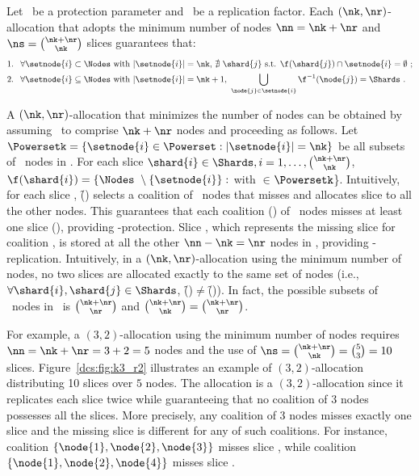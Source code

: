 \smallskip
\begin{theorem}\label{dcs:theo:p4}
Let \nk\ be a protection parameter and \nr\ be a replication
factor. Each $(\nk,\nr)$-allocation that adopts the minimum number of
nodes $\nn = \nk+\nr$ and $\ns=\binom{\nk+\nr}{\nk}$ slices guarantees
that:
	\begin{align*}
	    & \text{1. }\ \forall \setnode{i} \subset \Nodes \text{ with } |\setnode{i}| = \nk \text{, } \nexists\  \shard{j} \text{ s.t. } \f(\shard{j})\cap\setnode{i}=\emptyset\ ; \\
	    & \text{2. }\ \forall \setnode{i} \subseteq \Nodes \text{ with } |\setnode{i}| = \nk+1 \text{, } \bigcup_{\node{j}\in\setnode{i}} \f^{-1}(\node{j}) = \Shards\ .
	\end{align*}
\end{theorem}
\smallskip



A $(\nk,\nr)$-allocation that minimizes the number of nodes can be
obtained by assuming \Nodes\ to comprise $\nk + \nr$ nodes and
proceeding as follows. Let $\Powersetk = \{\setnode{i}\in\Powerset :
|\setnode{i}|=\nk\}$ be all subsets of \nk\ nodes in \Nodes. For each
slice $\shard{i}\in\Shards, i=1,\ldots,\binom{\nk+\nr}{\nk}$,
$\f(\shard{i})=\{\Nodes\ \setminus \{\setnode{i}\}:$ with
$\in$$\Powersetk$\}.  Intuitively, for each slice
, \f() selects a coalition of \nk\ nodes that misses
 and allocates slice  to all the other nodes. This
guarantees that each coalition () of \nk\ nodes misses at
least one slice (), providing \nk-protection. Slice
, which represents the missing slice for coalition
, is stored at all the other $\nn-\nk=\nr$ nodes in \Nodes,
providing \nr-replication.  Intuitively, in a $(\nk,\nr)$-allocation
using the minimum number of nodes, no two slices are allocated exactly
to the same set of nodes (i.e., $\forall \shard{i},\shard{j} \in
\Shards$, \f()$\neq$\f()).  In fact, the possible
subsets of \nr\ nodes in \Nodes\ is $\binom{\nk+\nr}{\nr}$ and
$\binom{\nk+\nr}{\nk}=\binom{\nk+\nr}{\nr}$.

For example, a $(3,2)$-allocation using the minimum number of nodes
requires $\nn=\nk+\nr=3+2=5$ nodes and the use of 
$\ns=\binom{\nk+\nr}{\nk}=\binom{5}{3}=10$ slices. Figure~\ref{dcs:fig:k3_r2} 
illustrates an example of $(3,2)$-allocation distributing 10 slices over 
 $5$ nodes. 
The allocation is a $(3,2)$-allocation since it replicates each slice twice 
while guaranteeing that no coalition of $3$ nodes possesses all the slices.
More precisely, any coalition of $3$ nodes misses exactly one slice
and the missing slice is different for any of such coalitions.
For instance, coalition $\{\node{1},\node{2},\node{3}\}$ 
misses slice , while coalition $\{\node{1},\node{2},\node{4}\}$
misses slice . 



